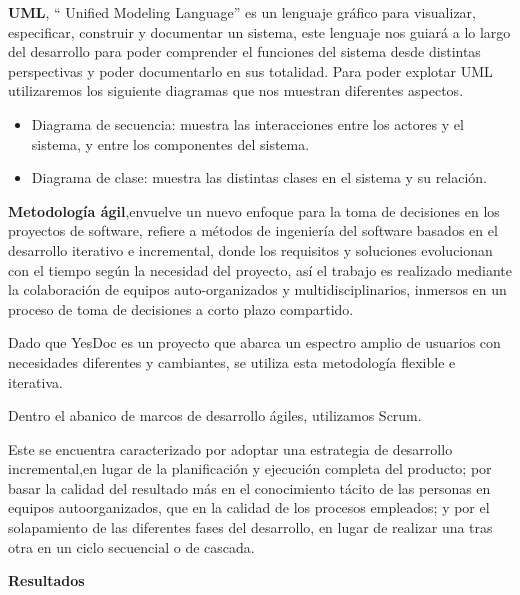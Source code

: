 \documentclass[a4paper,twocolumn,12pt]{article}
\begin{document}
\textbf{UML}, `` Unified Modeling Language'' es un lenguaje gráfico para visualizar, especificar, construir y documentar un sistema, este lenguaje nos guiará a lo largo del desarrollo para poder comprender el funciones del sistema desde distintas perspectivas y poder documentarlo en sus totalidad. Para poder explotar UML utilizaremos los siguiente diagramas que nos muestran diferentes aspectos.
  \begin{itemize}
    \item Diagrama de secuencia: muestra las interacciones entre los actores y el sistema, y entre los componentes del sistema.
    \item Diagrama de clase: muestra las distintas clases en el sistema y su relación.
  \end{itemize}

\textbf{Metodología ágil},envuelve un nuevo enfoque para la toma de decisiones en los proyectos de software, refiere a métodos de ingeniería del software basados en el desarrollo iterativo e incremental, donde los requisitos y soluciones evolucionan con el tiempo según la necesidad del proyecto, así el trabajo es realizado mediante la colaboración de equipos auto-organizados y multidisciplinarios, inmersos en un proceso de toma de decisiones a corto plazo compartido.\cite{agil} 

Dado que YesDoc es un proyecto que abarca un espectro amplio de usuarios con necesidades diferentes y cambiantes, se utiliza esta metodología flexible e iterativa.

Dentro el abanico de marcos de desarrollo ágiles, utilizamos Scrum. 

 Este se encuentra caracterizado por adoptar una estrategia de desarrollo incremental,en lugar de la planificación y ejecución completa del producto; por basar la calidad del resultado más en el conocimiento tácito de las personas en equipos autoorganizados, que en la calidad de los procesos empleados; y por el solapamiento de las diferentes fases del desarrollo, en lugar de realizar una tras otra en un ciclo secuencial o de cascada.\cite{wiki:scrum}


\vspace{3mm}
\textbf{Resultados}

\end{document}
